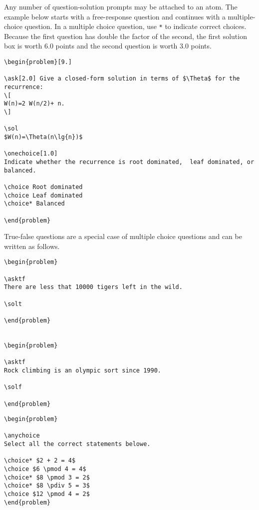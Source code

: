 \begin{example}

Any number of question-solution prompts may be attached to an atom.
The example below starts with a free-response question and continues
with a multiple-choice question.
%
In a multiple choice question, use \lstinline`*` to indicate correct choices.
%
Because the first question has double the factor of the second, the
first solution box is worth $6.0$ points and the second question is
worth $3.0$ points.

\begin{lstlisting}
\begin{problem}[9.]

\ask[2.0] Give a closed-form solution in terms of $\Theta$ for the recurrence:
\[
W(n)=2 W(n/2)+ n.
\]

\sol
$W(n)=\Theta(n\lg{n})$

\onechoice[1.0]
Indicate whether the recurrence is root dominated,  leaf dominated, or balanced.

\choice Root dominated
\choice Leaf dominated
\choice* Balanced

\end{problem}
\end{lstlisting}
\end{example}


\begin{example}

True-false questions are a special case of multiple choice questions
and can be written as follows.

\begin{lstlisting}
\begin{problem}

\asktf
There are less that 10000 tigers left in the wild.

\solt

\end{problem}


\begin{problem}

\asktf
Rock climbing is an olympic sort since 1990.

\solf

\end{problem}
\end{lstlisting}



\begin{lstlisting}
\begin{problem}

\anychoice
Select all the correct statements belowe.

\choice* $2 + 2 = 4$
\choice $6 \pmod 4 = 4$
\choice* $8 \pmod 3 = 2$
\choice* $8 \pdiv 5 = 3$
\choice $12 \pmod 4 = 2$
\end{problem}
\end{lstlisting}
\end{example}

